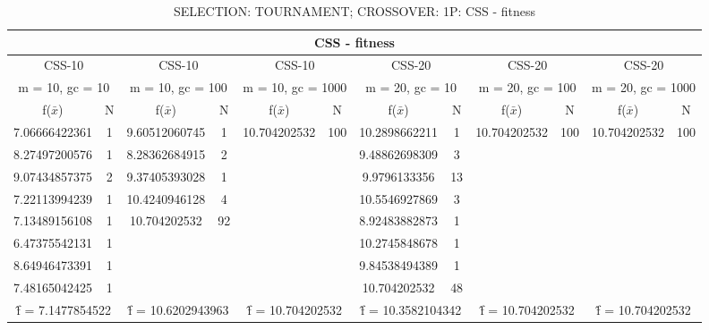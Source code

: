 \begin{table}[H]
	\centering
	\caption{SELECTION: TOURNAMENT; CROSSOVER: 1P: CSS - fitness}
	\begin{adjustbox}{width=1\textwidth}
		\begin{tabular}{ |c|c||c|c||c|c||c|c||c|c||c|c| }
			\hline
			\multicolumn{12}{|c|}{CSS - fitness} \\
			\hline
			\multicolumn{2}{|c||}{CSS-10} & \multicolumn{2}{c||}{CSS-10} & \multicolumn{2}{c||}{CSS-10} & \multicolumn{2}{c||}{CSS-20} & \multicolumn{2}{c||}{CSS-20} & \multicolumn{2}{c|}{CSS-20}\\
			\hline
			\multicolumn{2}{|c||}{m = 10, gc = 10} & \multicolumn{2}{c||}{m = 10, gc = 100} & \multicolumn{2}{c||}{m = 10, gc = 1000} & \multicolumn{2}{c||}{m = 20, gc = 10} & \multicolumn{2}{c||}{m = 20, gc = 100} & \multicolumn{2}{c|}{m = 20, gc = 1000}\\
			\hline
			f($\bar{x}$) & N & f($\bar{x}$) & N & f($\bar{x}$) & N & f($\bar{x}$) & N & f($\bar{x}$) & N & f($\bar{x}$) & N\\
			\hline
			\hline
			7.06666422361 & 1 & 9.60512060745 & 1 & 10.704202532 & 100 & 10.2898662211 & 1 & 10.704202532 & 100 & 10.704202532 & 100\\
			8.27497200576 & 1 & 8.28362684915 & 2 &   &   & 9.48862698309 & 3 &   &   &   &  \\
			9.07434857375 & 2 & 9.37405393028 & 1 &   &   & 9.9796133356 & 13 &   &   &   &  \\
			7.22113994239 & 1 & 10.4240946128 & 4 &   &   & 10.5546927869 & 3 &   &   &   &  \\
			7.13489156108 & 1 & 10.704202532 & 92 &   &   & 8.92483882873 & 1 &   &   &   &  \\
			6.47375542131 & 1 &   &   &   &   & 10.2745848678 & 1 &   &   &   &  \\
			8.64946473391 & 1 &   &   &   &   & 9.84538494389 & 1 &   &   &   &  \\
			7.48165042425 & 1 &   &   &   &   & 10.704202532 & 48 &   &   &   &  \\
			\hline
			\multicolumn{2}{|c||}{\^{f} = 7.1477854522} & \multicolumn{2}{c||}{\^{f} = 10.6202943963} & \multicolumn{2}{c||}{\^{f} = 10.704202532} & \multicolumn{2}{c||}{\^{f} = 10.3582104342} & \multicolumn{2}{c||}{\^{f} = 10.704202532} & \multicolumn{2}{c|}{\^{f} = 10.704202532}\\
			\hline
		\end{tabular}
	\end{adjustbox}
\end{table}
